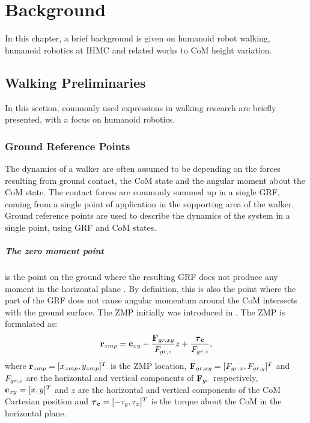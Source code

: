 %
\chapter{Background}\label{chap:background}
In this chapter, a brief background is given on humanoid robot walking, humanoid robotics at \ac{IHMC} and related works to \ac{CoM} height variation.
\section{Walking Preliminaries}
In this section, commonly used expressions in walking research are briefly presented, with a focus on humanoid robotics.
\subsection{Ground Reference Points}\label{sec:grp}
The dynamics of a walker are often assumed to be depending on the forces resulting from ground contact, the \ac{CoM} state and the angular moment about the \ac{CoM} state. The contact forces are commonly summed up in a single \ac{GRF}, coming from a single point of application in the supporting area of the walker. Ground reference points are used to describe the dynamics of the system in a single point, using \ac{GRF} and \ac{CoM} states.

\paragraph{The zero moment point} is the point on the ground where the resulting \ac{GRF} does not produce any moment in the horizontal plane \cite{sardain2004forces}. By definition, this is also the point where the part of the \ac{GRF} does not cause angular momentum around the \ac{CoM} intersects with the ground surface. The \ac{ZMP} initially was introduced in \cite{vukobratovic1969contribution}. The \ac{ZMP} is formulated as:
\begin{equation}
    \mathbf{r}_{zmp}=\mathbf{c}_{xy}-\frac{\mathbf{F}_{gr,xy}}{F_{gr,z}}z+\frac{\boldsymbol{\tau}_{\mathbf{c}}}{F_{gr,z}},
\end{equation}
where $\mathbf{r}_{zmp} = [x_{zmp}, y_{zmp}]^T$ is the \ac{ZMP} location, $\mathbf{F}_{gr,xy}=[F_{gr,x},F_{gr,y}]^T$ and $F_{gr,z}$ are the horizontal and vertical components of $\mathbf{F}_{gr}$ respectively, $\mathbf{c}_{xy} = [x,y]^T$ and $z$ are the horizontal and vertical components of the \ac{CoM} Cartesian position and $\boldsymbol{\tau}_{\mathbf{c}} = [-\tau_y,\tau_x]^T$ is the torque about the \ac{CoM} in the horizontal plane. 

